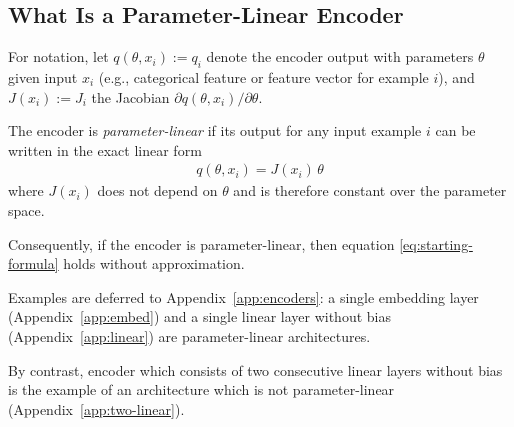 \subsection{What Is a Parameter-Linear Encoder}

For notation, let
\( q(\theta, x_i) := q_i \) 
denote the encoder output with parameters $\theta$ given input $x_i$ (e.g., categorical feature or feature vector for example $i$), and
\( J(x_i) := J_i \) 
the Jacobian $\partial q(\theta, x_i)/\partial\theta$.

The encoder is \emph{parameter-linear} if its output for any input example $i$ can be written in the exact linear form
\begin{align}
q(\theta, x_i) = J(x_i)\,\theta
\end{align}
where $J(x_i)$ does not depend on $\theta$ and is therefore constant over the parameter space.

Consequently, if the encoder is parameter-linear, then equation \eqref{eq:starting-formula} holds without approximation.

Examples are deferred to Appendix~\ref{app:encoders}: a single embedding layer (Appendix~\ref{app:embed}) and a single linear layer without bias (Appendix~\ref{app:linear}) are parameter-linear architectures.

By contrast, encoder which consists of two consecutive linear layers without bias is the example of an architecture which is not parameter-linear (Appendix~\ref{app:two-linear}).